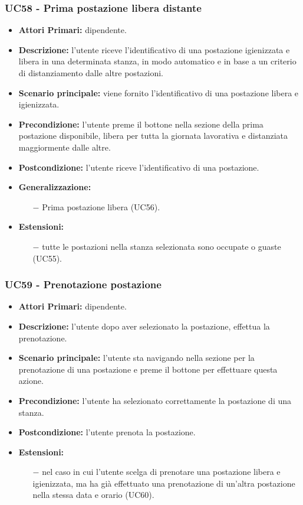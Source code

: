 \subsubsection{ UC58 - Prima postazione libera distante}
\begin{itemize}
	\item\textbf{Attori Primari:} dipendente.
	\item\textbf{Descrizione:} l’utente riceve l'identificativo di una postazione igienizzata e libera in una determinata stanza, 
	in modo automatico e in base a un criterio di distanziamento dalle altre postazioni.
	\item\textbf{Scenario principale:} viene fornito l'identificativo di una postazione libera e igienizzata.
	\item\textbf{Precondizione:} l’utente preme il bottone nella sezione della prima postazione disponibile, libera per tutta la giornata lavorativa e distanziata maggiormente dalle altre.
	\item\textbf{Postcondizione:} l’utente riceve l'identificativo di una postazione.
	\item\textbf{Generalizzazione:}
	\begin{itemize}
		\item[$-$] Prima postazione libera (UC56).
	\end{itemize}
	\item\textbf{Estensioni:}
	\begin{itemize}
		\item[$-$] tutte le postazioni nella stanza selezionata sono occupate o guaste (UC55).
	\end{itemize}
\end{itemize}
\subsubsection{ UC59 - Prenotazione postazione }
\begin{itemize}
	\item\textbf{Attori Primari:} dipendente.
	\item\textbf{Descrizione:} l’utente dopo aver selezionato la postazione, effettua la prenotazione. 
	\item\textbf{Scenario principale:} l’utente sta navigando nella sezione per la prenotazione di una postazione
	e preme il bottone per effettuare questa azione.
	\item\textbf{Precondizione:} l’utente ha selezionato correttamente la postazione di una stanza.
	\item\textbf{Postcondizione:} l'utente prenota la postazione.
	\item\textbf{Estensioni:}
	\begin{itemize}
		\item[$-$] nel caso in cui l'utente scelga di prenotare una postazione libera e igienizzata, ma ha già effettuato una prenotazione di un'altra postazione nella stessa data e orario (UC60).
	\end{itemize}
\end{itemize}
